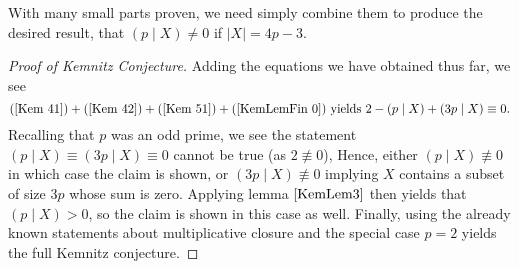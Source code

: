With many small parts proven, we need simply combine them to produce the desired result, that \(\left( p \mid X \right) \neq 0\) if \(\left| X \right|  = 4p-3\).
\begin{proof}[Proof of Kemnitz Conjecture]
	Adding the equations we have obtained thus far, we see
	\begin{equation}
		(\ref{Kem 41}) + (\ref{Kem 42}) + (\ref{Kem 51}) + (\ref{KemLemFin 0}) \text{ yields } 2 - \left( p \mid X \right)  + \left( 3p \mid X \right) \equiv 0.
	\end{equation}
	Recalling that \(p\) was an odd prime, we see the statement \(\left( p \mid X \right) \equiv \left( 3p \mid X \right) \equiv 0 \) cannot be true (as \(2 \not\equiv 0\)), Hence, either \(\left( p \mid X \right) \not\equiv 0\) in which case the claim is shown, or \(\left( 3p \mid X \right) \not\equiv 0\) implying \(X\) contains a subset of size \(3p\) whose sum is zero. Applying lemma \(\ref{KemLem3}\) then yields that \(\left( p \mid X \right)  > 0\), so the claim is shown in this case as well. Finally, using the already known statements about multiplicative closure and the special case \(p = 2\) yields the full Kemnitz conjecture.
\end{proof}
